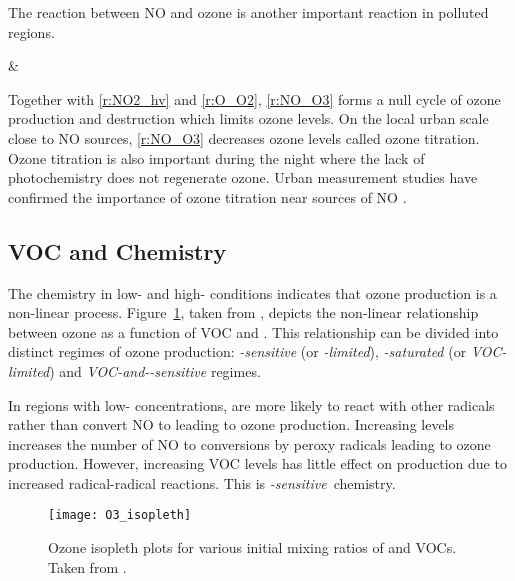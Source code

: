 The reaction between NO and ozone is another important reaction in polluted regions.
\begin{rxnarray}
     & \rightarrow {} \label{r:NO_O3}
\end{rxnarray}
Together with \eqref{r:NO2_hv} and \eqref{r:O_O2}, \eqref{r:NO_O3} forms a null cycle of ozone production and destruction which limits ozone levels.
On the local urban scale close to NO sources, \eqref{r:NO_O3} decreases ozone levels called ozone titration.
Ozone titration is also important during the night where the lack of photochemistry does not regenerate ozone.
Urban measurement studies have confirmed the importance of ozone titration near sources of NO \citep{Syri:2001}.

\subsection[VOC and NOx Chemistry]{VOC and  Chemistry} \label{ss:VOC_NOx}
The chemistry in low- and high- conditions indicates that ozone production is a non-linear process.
Figure~\ref{f:O3_isopleth}, taken from \citet{Jenkin:2000}, depicts the non-linear relationship between ozone as a function of VOC and .
This relationship can be divided into distinct regimes of ozone production: \emph{-sensitive} (or \emph{-limited}), \emph{-saturated} (or \emph{VOC-limited}) and \emph{VOC-and--sensitive} regimes. 

In regions with low- concentrations,  are more likely to react with other radicals rather than convert NO to  leading to ozone production.
Increasing  levels increases the number of NO to  conversions by peroxy radicals leading to ozone production.
However, increasing VOC levels has little effect on  production due to increased radical-radical reactions.
This is \emph{-sensitive}~chemistry.

\setlength{\textfloatsep}{1mm}
\begin{figure}[ht]%
	\begin{center}%
        \caption[Ozone mixing ratios as a function of  and VOCs]{Ozone isopleth plots for various initial mixing ratios of  and VOCs. Taken from \citet{Jenkin:2000}.}%
        \texttt{[image: O3\_isopleth]}%
		\label{f:O3_isopleth}%
	\end{center}%
\end{figure}%

